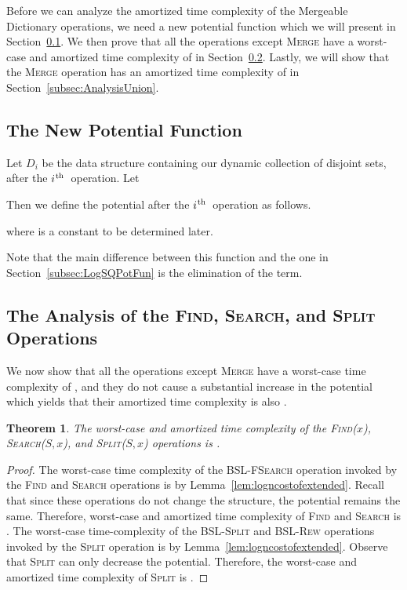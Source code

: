 \documentclass[11pt]{article}
\newcommand{\ens}[1]{\ensuremath{#1}}
\newcommand{\ith}{\ens{i^{\mbox{\hspace{.2mm}\scriptsize th}}}}
\newcommand{\Ds}{Mergeable Dictionary}
\newcommand{\kwMs}{Make-Set}
\newcommand{\kwSpl}{Split}
\newcommand{\kwUnion}{Merge}
\newcommand{\kwSrc}{Search}
\newcommand{\kwFind}{Find}
\newcommand{\Ms}{\mbox{\textsc{\kwMs}}}
\newcommand{\Spl}{\mbox{\textsc{\kwSpl}}}
\newcommand{\Splx}[2]{\mbox{\textsc{\kwSpl(\ensuremath{#1,#2})}}}
\newcommand{\Union}{\mbox{\textsc{\kwUnion{}}}}
\newcommand{\Src}{\mbox{\textsc{\kwSrc}}}
\newcommand{\Srcx}[2]{\mbox{\textsc{\kwSrc(\ensuremath{#1,#2})}}}
\newcommand{\Find}{\mbox{\textsc{\kwFind}}}
\newcommand{\Findx}[1]{\mbox{\textsc{\kwFind(\ensuremath{#1})}}}
\newcommand{\Bslfsrc}{\mbox{\textsc{BSL-FSearch}}}
\newcommand{\Bslspl}{\mbox{\textsc{BSL-Split}}}
\newcommand{\Bslrew}{\mbox{\textsc{BSL-Rew}}}
\newcommand{\datast}[1]{\ensuremath{D_{#1}}}
\newcommand{\hide}[1]{}
\newcounter{count}
\newtheorem{thm}[count]{Theorem}
\begin{document}
Before we can analyze the amortized time complexity of the \Ds{} operations, we need a new potential function which we will present in Section~\ref{subsec:AnalysisPotential}. We then prove that all the operations except \Union{} have a worst-case and amortized time complexity of  in Section~\ref{subsec:AnalysisOthers}. Lastly, we will show that the \Union{} operation has an amortized time complexity of  in Section~\ref{subsec:AnalysisUnion}. 


\subsection{The New Potential Function} 
\label{subsec:AnalysisPotential} 


Let \datast i be the data structure containing our dynamic collection of disjoint sets,  after the \ith\ operation. Let 
 
 Then we define the potential after the \ith\ operation as follows. 

where  is a constant to be determined later. 

Note that the main difference between this 
function and the one in Section~\ref{subsec:LogSQPotFun} is the elimination of the  term. 


\subsection{The Analysis of the \hide{\Ms{}, }\Find{}, \Src{}, and \Spl{} Operations} 
\label{subsec:AnalysisOthers} 
We now show that all the operations except \Union{} have a worst-case time  complexity of , and they do not cause a substantial increase in the potential which yields that  their amortized time complexity is also . 

\begin{thm} 
\label{thm:otheropsbound} 
The worst-case and amortized time complexity of the \Findx{x}, \Srcx{S}{x}, and \Splx{S}{x} operations is . 
\end{thm} 

\begin{proof} 
The worst-case time complexity of the \Bslfsrc{} operation invoked by the \Find{} and \Src{} operations is  by Lemma~\ref{lem:logncostofextended}.  Recall that since these operations do not change the structure, the potential remains the same. Therefore, worst-case and amortized time complexity of \Find{} and \Src{} is . 
The worst-case time-complexity of the \Bslspl{} and \Bslrew{} operations invoked by the \Spl{} operation is  by Lemma~\ref{lem:logncostofextended}. Observe that \Spl{} can only decrease the potential. Therefore, the worst-case and amortized time complexity of \Spl{} is . 
\end{proof} 
\end{document}
